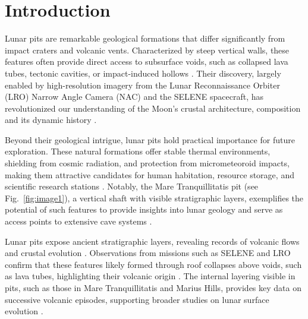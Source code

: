 \graphicspath{{img/ch1}}

\section{Introduction}
Lunar pits are remarkable geological formations that differ significantly from impact craters and volcanic vents. Characterized by steep vertical walls, these features often provide direct access to subsurface voids, such as collapsed lava tubes, tectonic cavities, or impact-induced hollows \cite{lunar-pit-distribution, lunar-pits-entrances-to-caves, new-wagner}. Their discovery, largely enabled by high-resolution imagery from the Lunar Reconnaissance Orbiter (LRO) Narrow Angle Camera (NAC) and the SELENE spacecraft, has revolutionized our understanding of the Moon's crustal architecture, composition and its dynamic history \cite{lro, sublunear-lava, Carrer2024}.

Beyond their geological intrigue, lunar pits hold practical importance for future exploration. These natural formations offer stable thermal environments, shielding from cosmic radiation, and protection from micrometeoroid impacts, making them attractive candidates for human habitation, resource storage, and scientific research stations \cite{bases-feng, newer-thermal, sublunear-lava}. Notably, the Mare Tranquillitatis pit (see Fig.~\ref{fig:image1}), a vertical shaft with visible stratigraphic layers, exemplifies the potential of such features to provide insights into lunar geology and serve as access points to extensive cave systems \cite{sublunear-lava, Carrer2024}.

Lunar pits expose ancient stratigraphic layers, revealing records of volcanic flows and crustal evolution \cite{sublunear-lava, lunar-pit-distribution}. Observations from missions such as SELENE and LRO confirm that these features likely formed through roof collapses above voids, such as lava tubes, highlighting their volcanic origin \cite{lunar-pits-numerical-modelling, radar-observations-lava-tubes}. The internal layering visible in pits, such as those in Mare Tranquillitatis and Marius Hills, provides key data on successive volcanic episodes, supporting broader studies on lunar surface evolution \cite{sublunear-lava, newer-thermal, bases-feng}.

